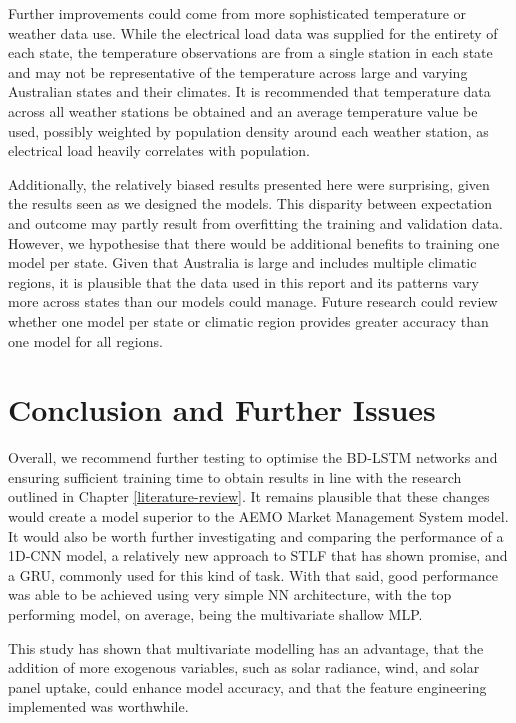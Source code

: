 \documentclass[mstat,12pt]{unswthesis}
\begin{document}
Further improvements could come from more sophisticated temperature or weather data use. While the electrical load data was supplied for the entirety of each state, the temperature observations are from a single station in each state and may not be representative of the temperature across large and varying Australian states and their climates. It is recommended that temperature data across all weather stations be obtained and an average temperature value be used, possibly weighted by population density around each weather station, as electrical load heavily correlates with population.

Additionally, the relatively biased results presented here were surprising, given the results seen as we designed the models. This disparity between expectation and outcome may partly result from overfitting the training and validation data. However, we hypothesise that there would be additional benefits to training one model per state. Given that Australia is large and includes multiple climatic regions, it is plausible that the data used in this report and its patterns vary more across states than our models could manage. Future research could review whether one model per state or climatic region provides greater accuracy than one model for all regions.


\hypertarget{conclusion-and-further-issues}{%
\chapter{Conclusion and Further
Issues}\label{conclusion-and-further-issues}}

Overall, we recommend further testing to optimise the BD-LSTM networks and ensuring sufficient training time to obtain results in line with the research outlined in Chapter \ref{literature-review}. It remains plausible that these changes would create a model superior to the AEMO Market Management System model. It would also be worth further investigating and comparing the performance of a 1D-CNN model, a relatively new approach to STLF that has shown promise, and a GRU, commonly used for this kind of task. With that said, good performance was able to be achieved using very simple NN architecture, with the top performing model, on average, being the multivariate shallow MLP.

This study has shown that multivariate modelling has an advantage, that the addition of more exogenous variables, such as solar radiance, wind, and solar panel uptake, could enhance model accuracy, and that the feature engineering implemented was worthwhile.
\end{document}
